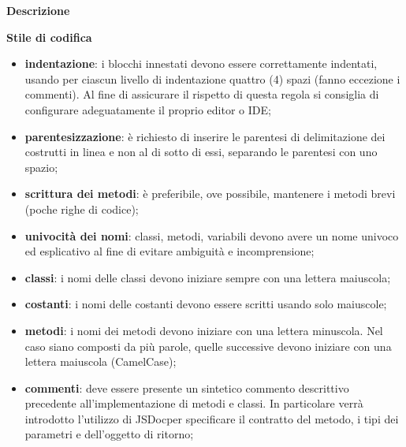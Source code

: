 			\noindent\textbf{Descrizione} \mbox{}\\
			
			 \newline 
			
			\noindent\textbf{Stile di codifica} \mbox{}\\
			
				\begin{itemize}
					\item \textbf{indentazione}: i blocchi innestati devono essere correttamente 
						indentati, usando per ciascun livello di indentazione quattro (4) spazi (fanno 
						eccezione i commenti). Al fine di assicurare il rispetto di questa regola si 
						consiglia di configurare adeguatamente il proprio editor o IDE;
					\item \textbf{parentesizzazione}: è richiesto di inserire 
					le parentesi di delimitazione dei costrutti in linea e non 
					al di sotto di essi, separando le parentesi con uno spazio;
					\item \textbf{scrittura dei metodi}: è preferibile, ove possibile, 
						mantenere i metodi brevi (poche righe di codice);
					\item \textbf{univocità dei nomi}: classi, metodi, variabili devono avere un 
						nome univoco	ed esplicativo al fine di evitare ambiguità e incomprensione;
					\item \textbf{classi}: i nomi delle classi devono iniziare sempre con una 
						lettera maiuscola;		
					\item \textbf{costanti}: i nomi delle costanti devono essere scritti usando 
						solo maiuscole;
					\item \textbf{metodi}: i nomi dei metodi devono iniziare con una lettera 
						minuscola. Nel caso siano composti da più parole, quelle successive devono iniziare con una 
						lettera maiuscola (CamelCase\glo{});
					\item \textbf{commenti}: deve essere presente un sintetico commento descrittivo precedente all'implementazione di metodi e classi. In particolare verrà introdotto l'utilizzo di JSDoc\glosp per specificare il contratto del metodo, i tipi dei parametri e dell'oggetto di ritorno;

\end{itemize}
